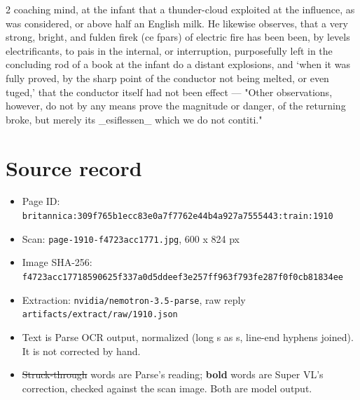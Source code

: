 \documentclass[10pt]{article}
\begin{document}
\begin{multicols}{2}
coaching mind, at the infant that a thunder-cloud exploited at the influence, as was considered, or above half an English milk. He likewise observes, that a very strong, bright, and fulden firek (ce fpars) of electric fire has been been, by levels electrificants, to pais in the internal, or interruption, purposefully left in the concluding rod of a book at the infant do a distant explosions, and ‘when it was fully proved, by the sharp point of the conductor not being melted, or even tuged,' that the conductor itself had not been effect — "Other observations, however, do not by any means prove the magnitude or danger, of the returning broke, but merely its \_esiflessen\_ which we do not contiti."
\end{multicols}
\section*{Source record}
\begin{itemize}
\item Page ID: \texttt{britannica:309f765b1ecc83e0a7f7762e44b4a927a7555443:train:1910}
\item Scan: \texttt{page-1910-f4723acc1771.jpg}, 600 x 824 px
\item Image SHA-256: \texttt{\small f4723acc17718590625f337a0d5ddeef3e257ff963f793fe287f0f0cb81834ee}
\item Extraction: \texttt{nvidia/nemotron-3.5-parse}, raw reply \texttt{artifacts/extract/raw/1910.json}
\item Text is Parse OCR output, normalized (long s as s, line-end hyphens joined). It is not corrected by hand.
\item \sout{Struck-through} words are Parse's reading; \textbf{bold} words are Super VL's correction, checked against the scan image. Both are model output.
\end{itemize}
\end{document}
